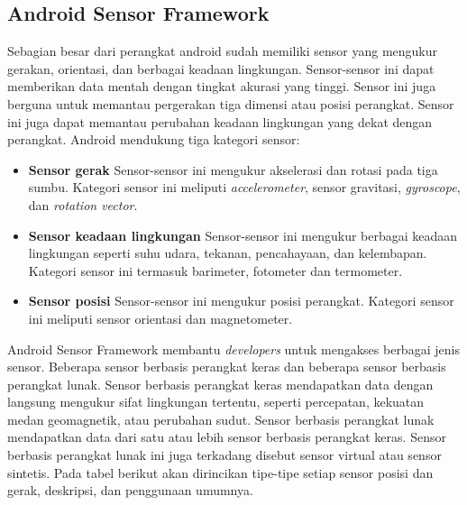 \subsection{Android Sensor Framework}
\label{sec:android_sensor_framework}
Sebagian besar dari perangkat android sudah memiliki sensor yang mengukur gerakan, orientasi, dan berbagai keadaan lingkungan.\cite{android_developers} Sensor-sensor ini dapat memberikan data mentah dengan tingkat akurasi yang tinggi. Sensor ini juga berguna untuk memantau pergerakan tiga dimensi atau posisi perangkat. Sensor ini juga dapat memantau perubahan keadaan lingkungan yang dekat dengan perangkat. 
Android mendukung tiga kategori sensor:
\begin{itemize}
	\item \textbf{Sensor gerak}
	Sensor-sensor ini mengukur akselerasi dan rotasi pada tiga sumbu. Kategori sensor ini meliputi \textit{accelerometer}, sensor gravitasi, \textit{gyroscope}, dan \textit{rotation vector}. 
	\item \textbf{Sensor keadaan lingkungan}
	Sensor-sensor ini mengukur berbagai keadaan lingkungan seperti suhu udara, tekanan, pencahayaan, dan kelembapan. Kategori sensor ini termasuk barimeter, fotometer dan termometer.
	\item \textbf{Sensor posisi}
	Sensor-sensor ini mengukur posisi perangkat. Kategori sensor ini meliputi sensor orientasi dan magnetometer.
\end{itemize}
Android Sensor Framework membantu \textit{developers} untuk mengakses berbagai jenis sensor. Beberapa sensor berbasis perangkat keras dan beberapa sensor berbasis perangkat lunak. Sensor berbasis perangkat keras mendapatkan data dengan langsung mengukur sifat lingkungan tertentu, seperti percepatan, kekuatan medan geomagnetik, atau perubahan sudut. Sensor berbasis perangkat lunak mendapatkan data dari satu atau lebih sensor berbasis perangkat keras. Sensor berbasis perangkat lunak ini juga terkadang disebut sensor virtual atau sensor sintetis. Pada tabel berikut akan dirincikan tipe-tipe setiap sensor posisi dan gerak, deskripsi, dan penggunaan umumnya.

